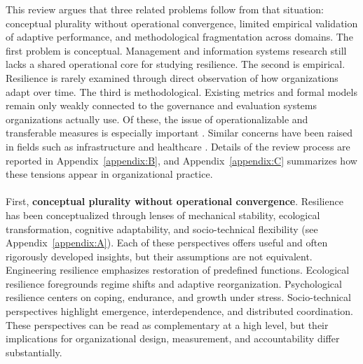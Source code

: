This review argues that three related problems follow from that situation: conceptual plurality without operational convergence, limited empirical validation of adaptive performance, and methodological fragmentation across domains. The first problem is conceptual. Management and information systems research still lacks a shared operational core for studying resilience. The second is empirical. Resilience is rarely examined through direct observation of how organizations adapt over time. The third is methodological. Existing metrics and formal models remain only weakly connected to the governance and evaluation systems organizations actually use. Of these, the issue of operationalizable and transferable measures is especially important \autocite{woods2015four}. Similar concerns have been raised in fields such as infrastructure and healthcare \autocite{heinimann2017infrastructure,kruk2017building}. Details of the review process are reported in Appendix~\ref{appendix:B}, and Appendix~\ref{appendix:C} summarizes how these tensions appear in organizational practice.\\
\\
First, \textbf{conceptual plurality without operational convergence}. Resilience has been conceptualized through lenses of mechanical stability, ecological transformation, cognitive adaptability, and socio-technical flexibility (see Appendix~\ref{appendix:A}). Each of these perspectives offers useful and often rigorously developed insights, but their assumptions are not equivalent. Engineering resilience emphasizes restoration of predefined functions. Ecological resilience foregrounds regime shifts and adaptive reorganization. Psychological resilience centers on coping, endurance, and growth under stress. Socio-technical perspectives highlight emergence, interdependence, and distributed coordination. These perspectives can be read as complementary at a high level, but their implications for organizational design, measurement, and accountability differ substantially.\\

